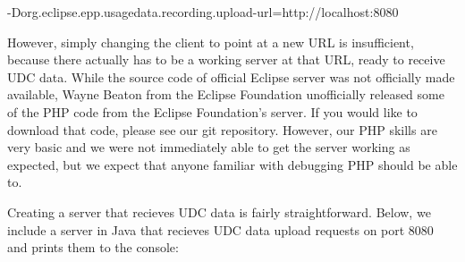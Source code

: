 \noindent-Dorg.eclipse.epp.usagedata.recording.upload-url=http://localhost:8080

However, simply changing the client to point at a new URL is insufficient, 
because there actually has to be a working server at that URL, ready to 
receive UDC data.
While the source code of official Eclipse server was not officially made 
available, Wayne Beaton from the Eclipse Foundation unofficially released
some of the PHP code from the Eclipse Foundation's server.
If you would like to download that code, please see our git repository.
However, our PHP skills are very basic and we were not immediately able
to get the server working as expected, but we expect that anyone familiar with
debugging PHP should be able to.

Creating a server that recieves UDC data is fairly straightforward.
Below, we include a server in Java that recieves UDC data upload requests
on port 8080 and prints them to the console:

